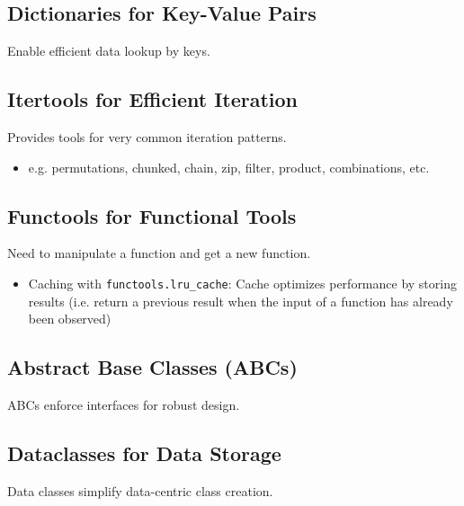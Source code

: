 \subsection{Dictionaries for Key-Value Pairs}
\begin{notes}
    Enable efficient data lookup by keys.
\end{notes}

\subsection{Itertools for Efficient Iteration}
\begin{notes}
    Provides tools for very common iteration patterns.
    \begin{itemize}
        \item e.g. permutations, chunked, chain, zip, filter, product, combinations, etc.
    \end{itemize}
\end{notes}

\subsection{Functools for Functional Tools}
\begin{notes}
    Need to manipulate a function and get a new function. 
    \begin{itemize}
        \item Caching with \texttt{functools.lru\_cache}: Cache optimizes performance by storing results (i.e. return a previous result when the input of a function has already been observed)
    \end{itemize}
\end{notes}

\subsection{Abstract Base Classes (ABCs)}
\begin{notes}
    ABCs enforce interfaces for robust design.
\end{notes}

\subsection{Dataclasses for Data Storage}
\begin{notes}
    Data classes simplify data-centric class creation.
\end{notes}

